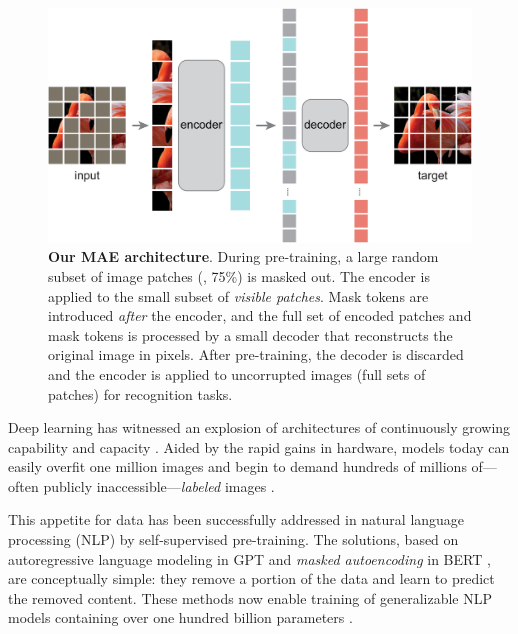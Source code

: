 \documentclass[10pt,twocolumn,letterpaper]{article}
\begin{document}
\begin{figure}[t]\centering
\includegraphics[width=0.98\linewidth]{fig/arch}
\caption{\textbf{Our MAE architecture}. During pre-training, a large random subset of image patches (\eg, 75\%) is masked out. The encoder is applied to the small subset of \emph{visible patches}. Mask tokens are introduced \textit{after} the encoder, and the full set of encoded patches and mask tokens is processed by a small decoder that reconstructs the original image in pixels. After pre-training, the decoder is discarded and the encoder is applied to uncorrupted images (full sets of patches) for recognition tasks.}
\label{fig:arch}
\end{figure}

Deep learning has witnessed an explosion of architectures of continuously growing capability and capacity \cite{Krizhevsky2012, He2016, Vaswani2017}. Aided by the rapid gains in hardware, models today can easily overfit one million images \cite{Deng2009} and begin to demand hundreds of millions of---often publicly inaccessible---\textit{labeled} images \cite{Dosovitskiy2021}.

This appetite for data has been successfully addressed in natural language processing (NLP) by self-supervised pre-training. The solutions, based on autoregressive language modeling in GPT \cite{Radford2018, Radford2019, Brown2020} and \emph{masked autoencoding} in BERT \cite{Devlin2019}, are conceptually simple: they remove a portion of the data and learn to predict the removed content. These methods now enable training of generalizable NLP models containing over one hundred billion parameters \cite{Brown2020}.
\end{document}
